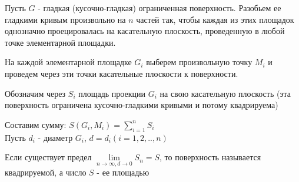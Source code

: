 Пусть $G$ - гладкая (кусочно-гладкая) ограниченная поверхность. Разобьем ее гладкими кривым произвольно на $n$ частей так, чтобы каждая из этих площадок однозначно проецировалась на касательную плоскость, проведенную  в любой точке элементарной площадки.

На каждой элементарной площадке $G_i$ выберем произвольную точку $M_i$ и проведем через эти точки касательные плоскости к поверхности. 

Обозначим через $S_i$ площадь проекции $G_i$ на свою касательную плоскость (эта поверхность ограничена кусочно-гладкими кривыми и потому квадрируема)

Составим сумму: $S(G_i,M_i) = \sum\limits_{i=1}^{n}S_i$\\
Пусть $d_i$ - диаметр $G_i$, $d= d_i (i= 1,2,..,n)$

Если существует предел $\lim\limits_{n\to\infty, d\to 0} S_n = S$, то поверхность называется квадрируемой, а число $S$ - ее площадью